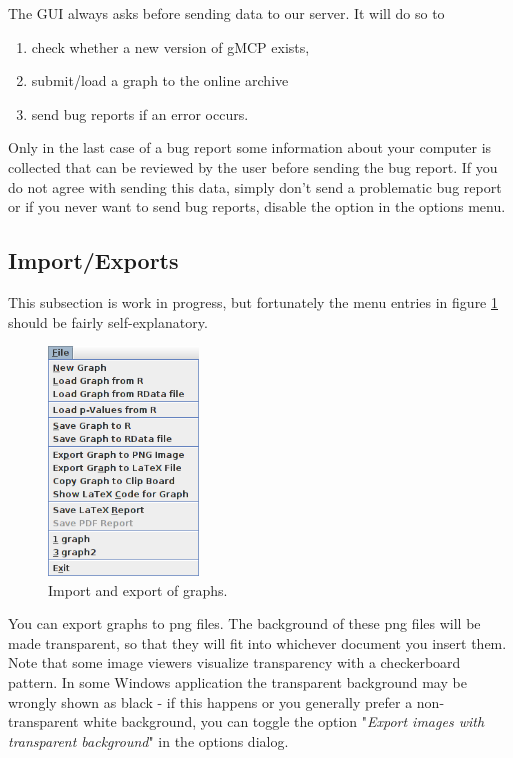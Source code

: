 \documentclass[a4paper, 10pt]{article}\usepackage[]{graphicx}\usepackage[]{color}
\numberwithin{equation}{section}
\theoremstyle{definition}
\theoremstyle{plain}
\begin{document}
The GUI always asks before sending data to our server. It will do so to
\begin{enumerate}
  \item check whether a new version of gMCP exists,  
  \item submit/load a graph to the online archive 
  \item send bug reports if an error occurs.
\end{enumerate}

Only in the last case of a bug report some information about your
computer is collected that can be reviewed by the user before sending
the bug report. If you do not agree with sending this data, simply
don't send a problematic bug report or if you never want to send bug
reports, disable the option in the options menu.

\subsection{Import/Exports}

This subsection is work in progress, but fortunately the menu entries
in figure \ref{fig:fileMenu} should be fairly self-explanatory.

\begin{figure}[ht]
  \centering    
  \includegraphics[width=4cm]{pictures/filemenu.png}      
  \caption{\label{fig:fileMenu} Import and export of graphs.}
\end{figure}

You can export graphs to png files. The background of these png files
will be made transparent, so that they will fit into whichever
document you insert them.  Note that some image viewers visualize
transparency with a checkerboard pattern. In some Windows application
the transparent background may be wrongly shown as black - if this
happens or you generally prefer a non-transparent white background,
you can toggle the option "\emph{Export images with transparent 
background}" in the options dialog.
\end{document}
